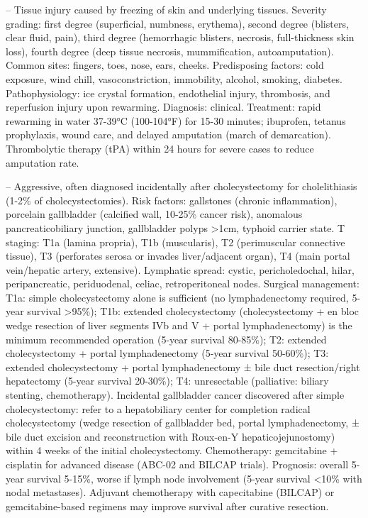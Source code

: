 -- Tissue injury caused by freezing of skin and underlying tissues. Severity grading: first degree (superficial, numbness, erythema), second degree (blisters, clear fluid, pain), third degree (hemorrhagic blisters, necrosis, full-thickness skin loss), fourth degree (deep tissue necrosis, mummification, autoamputation). Common sites: fingers, toes, nose, ears, cheeks. Predisposing factors: cold exposure, wind chill, vasoconstriction, immobility, alcohol, smoking, diabetes. Pathophysiology: ice crystal formation, endothelial injury, thrombosis, and reperfusion injury upon rewarming. Diagnosis: clinical. Treatment: rapid rewarming in water 37-39°C (100-104°F) for 15-30 minutes; ibuprofen, tetanus prophylaxis, wound care, and delayed amputation (march of demarcation). Thrombolytic therapy (tPA) within 24 hours for severe cases to reduce amputation rate.

-- Aggressive, often diagnosed incidentally after cholecystectomy for cholelithiasis (1-2\% of cholecystectomies). Risk factors: gallstones (chronic inflammation), porcelain gallbladder (calcified wall, 10-25\% cancer risk), anomalous pancreaticobiliary junction, gallbladder polyps >1cm, typhoid carrier state. T staging: T1a (lamina propria), T1b (muscularis), T2 (perimuscular connective tissue), T3 (perforates serosa or invades liver/adjacent organ), T4 (main portal vein/hepatic artery, extensive). Lymphatic spread: cystic, pericholedochal, hilar, peripancreatic, periduodenal, celiac, retroperitoneal nodes. Surgical management: T1a: simple cholecystectomy alone is sufficient (no lymphadenectomy required, 5-year survival >95\%); T1b: extended cholecystectomy (cholecystectomy + en bloc wedge resection of liver segments IVb and V + portal lymphadenectomy) is the minimum recommended operation (5-year survival 80-85\%); T2: extended cholecystectomy + portal lymphadenectomy (5-year survival 50-60\%); T3: extended cholecystectomy + portal lymphadenectomy ± bile duct resection/right hepatectomy (5-year survival 20-30\%); T4: unresectable (palliative: biliary stenting, chemotherapy). Incidental gallbladder cancer discovered after simple cholecystectomy: refer to a hepatobiliary center for completion radical cholecystectomy (wedge resection of gallbladder bed, portal lymphadenectomy, ± bile duct excision and reconstruction with Roux-en-Y hepaticojejunostomy) within 4 weeks of the initial cholecystectomy. Chemotherapy: gemcitabine + cisplatin for advanced disease (ABC-02 and BILCAP trials). Prognosis: overall 5-year survival 5-15\%, worse if lymph node involvement (5-year survival <10\% with nodal metastases). Adjuvant chemotherapy with capecitabine (BILCAP) or gemcitabine-based regimens may improve survival after curative resection.

